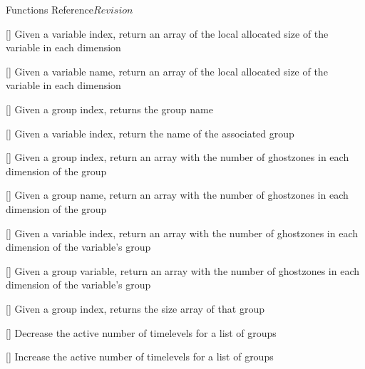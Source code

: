\begin{cactuspart}{ Functions Reference}{}{$Revision$}
\begin{Lentry}
\item[\code{CCTK\_GroupashVI}] [\pageref{CCTK-GroupashVI}]
  Given a variable index, return an array of the local allocated size
  of the variable in each dimension

\item[\code{CCTK\_GroupashVN}] [\pageref{CCTK-GroupashVN}]
  Given a variable name, return an array of the local allocated size
  of the variable in each dimension

\item[\code{CCTK\_GroupName}] [\pageref{CCTK-GroupName}]
  Given a group index, returns the group name

\item[\code{CCTK\_GroupNameFromVarI}] [\pageref{CCTK-GroupNameFromVarI}]
  Given a variable index, return the name of the associated group

\item[\code{CCTK\_GroupnghostzonesGI}] [\pageref{CCTK-GroupnghostzonesGI}]
  Given a group index, return an array with the number of ghostzones
  in each dimension of the group

\item[\code{CCTK\_GroupnghostzonesGN}] [\pageref{CCTK-GroupnghostzonesGN}]
  Given a group name, return an array with the number of ghostzones
  in each dimension of the group

\item[\code{CCTK\_GroupnghostzonesVI}] [\pageref{CCTK-GroupnghostzonesVI}]
  Given a variable index, return an array with the number of ghostzones
  in each dimension of the variable's group

\item[\code{CCTK\_GroupnghostzonesVN}] [\pageref{CCTK-GroupnghostzonesVN}]
  Given a group variable, return an array with the number of ghostzones
  in each dimension of the variable's group

\item[\code{CCTK\_GroupSizesI}] [\pageref{CCTK-GroupSizesI}]
  Given a group index, returns the size array of that group

\item[\code{CCTK\_GroupStorageDecrease}] [\pageref{CCTK-GroupStorageDecrease}]
  Decrease the active number of timelevels for a list of groups

\item[\code{CCTK\_GroupStorageIncrease}] [\pageref{CCTK-GroupStorageIncrease}]
  Increase the active number of timelevels for a list of groups


\end{Lentry}
\end{cactuspart}
